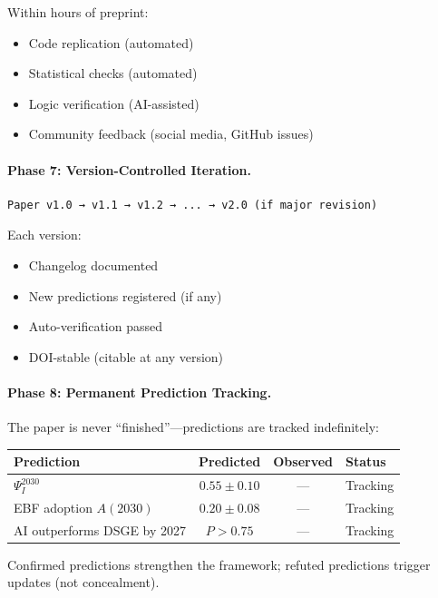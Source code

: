 Within hours of preprint:
\begin{itemize}[nosep]
    \item Code replication (automated)
    \item Statistical checks (automated)
    \item Logic verification (AI-assisted)
    \item Community feedback (social media, GitHub issues)
\end{itemize}

\paragraph{Phase 7: Version-Controlled Iteration.}

\begin{verbatim}
Paper v1.0 → v1.1 → v1.2 → ... → v2.0 (if major revision)
\end{verbatim}

Each version:
\begin{itemize}[nosep]
    \item Changelog documented
    \item New predictions registered (if any)
    \item Auto-verification passed
    \item DOI-stable (citable at any version)
\end{itemize}

\paragraph{Phase 8: Permanent Prediction Tracking.}

The paper is never ``finished''---predictions are tracked indefinitely:

\begin{center}
\small
\begin{tabular}{@{}lccl@{}}
\toprule
\textbf{Prediction} & \textbf{Predicted} & \textbf{Observed} & \textbf{Status} \\
\midrule
$\Psi_I^{2030}$ & $0.55 \pm 0.10$ & --- & Tracking \\
EBF adoption $A(2030)$ & $0.20 \pm 0.08$ & --- & Tracking \\
AI outperforms DSGE by 2027 & $P > 0.75$ & --- & Tracking \\
\bottomrule
\end{tabular}
\end{center}

Confirmed predictions strengthen the framework; refuted predictions trigger updates
(not concealment).

